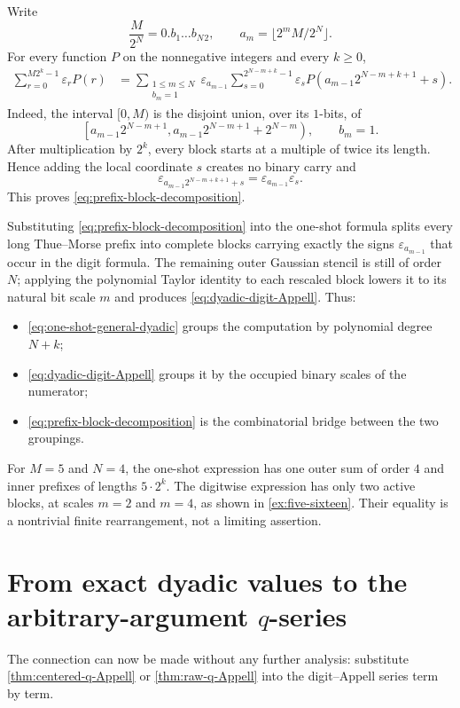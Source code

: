 \documentclass[11pt,oneside]{article}
\theoremstyle{definition}
\theoremstyle{remark}
\newcommand{\eps}{\varepsilon}
\begin{document}
Write
\[
 \frac{M}{2^N}=0.b_1\ldots b_N{}_2,
 \qquad
 a_m=\lfloor2^mM/2^N\rfloor.
\]
For every function $P$ on the nonnegative integers and every $k\ge0$,
\begin{align}\label{eq:prefix-block-decomposition}
 \sum_{r=0}^{M2^k-1}\eps_rP(r)
 &=\sum_{\substack{1\le m\le N\\b_m=1}}
 \eps_{a_{m-1}}
 \sum_{s=0}^{2^{N-m+k}-1}\eps_s
 P\!\left(a_{m-1}2^{N-m+k+1}+s\right).
\end{align}
Indeed, the interval $[0,M)$ is the disjoint union, over its $1$-bits, of
\[
 \left[a_{m-1}2^{N-m+1},
       a_{m-1}2^{N-m+1}+2^{N-m}\right),
 \qquad b_m=1.
\]
After multiplication by $2^k$, every block starts at a multiple of twice its
length.  Hence adding the local coordinate $s$ creates no binary carry and
\[
 \eps_{a_{m-1}2^{N-m+k+1}+s}
 =\eps_{a_{m-1}}\eps_s.
\]
This proves \eqref{eq:prefix-block-decomposition}.

Substituting \eqref{eq:prefix-block-decomposition} into the one-shot formula
splits every long Thue--Morse prefix into complete blocks carrying exactly the
signs $\eps_{a_{m-1}}$ that occur in the digit formula.  The remaining outer
Gaussian stencil is still of order $N$; applying the polynomial Taylor
identity to each rescaled block lowers it to its natural bit scale $m$ and
produces \eqref{eq:dyadic-digit-Appell}.  Thus:
\begin{itemize}
\item \eqref{eq:one-shot-general-dyadic} groups the computation by polynomial
  degree $N+k$;
\item \eqref{eq:dyadic-digit-Appell} groups it by the occupied binary scales of
  the numerator;
\item \eqref{eq:prefix-block-decomposition} is the combinatorial bridge between
  the two groupings.
\end{itemize}

For $M=5$ and $N=4$, the one-shot expression has one outer sum of order $4$
and inner prefixes of lengths $5\cdot2^k$.  The digitwise expression has only
two active blocks, at scales $m=2$ and $m=4$, as shown in
\cref{ex:five-sixteen}.  Their equality is a nontrivial finite rearrangement,
not a limiting assertion.

\section{From exact dyadic values to the arbitrary-argument $q$-series}

The connection can now be made without any further analysis: substitute
\cref{thm:centered-q-Appell} or \cref{thm:raw-q-Appell} into the digit--Appell
series term by term.
\end{document}
